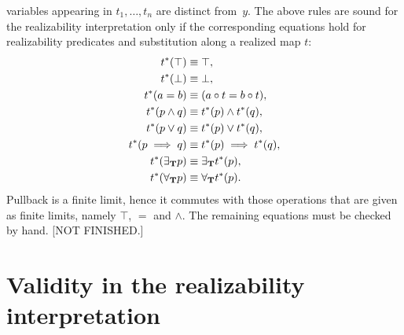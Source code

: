 variables appearing in $t_1, \ldots, t_n$ are distinct from~$y$. The
above rules are sound for the realizability interpretation only if the
corresponding equations hold for realizability predicates and
substitution along a realized map $t$:
%
\begin{align*}
  t^{*}(\top) &\equiv \top,\\
  t^{*}(\bot) &\equiv \bot,\\
  t^{*}(a = b) &\equiv (a \circ t = b \circ t),\\
  t^{*}(p \land q) &\equiv t^{*}(p) \land t^{*}(q),\\
  t^{*}(p \lor q) &\equiv t^{*}(p) \lor t^{*}(q),\\
  t^{*}(p \implies q) &\equiv t^{*}(p) \implies t^{*}(q),\\
  t^{*}(\exists_{\mathbf{T}} p) &\equiv \exists_{\mathbf{T}} t^{*}(p),\\
  t^{*}(\forall_{\mathbf{T}} p) &\equiv \forall_{\mathbf{T}} t^{*}(p).
\end{align*}
%
Pullback is a finite limit, hence it commutes with those operations
that are given as finite limits, namely $\top$, $=$ and $\land$. The
remaining equations must be checked by hand. [NOT FINISHED.]


\section{Validity in the realizability interpretation}
\label{sec:realizability-validity}

